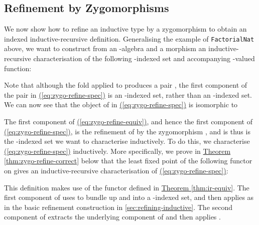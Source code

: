 \documentclass{LMCS}
\newcommand{\parenref}[1]{\hyperref[#1]{(\ref*{#1})}}
\newcommand{\thmref}[1]{\hyperref[#1]{Theorem \ref*{#1}}}
\begin{document}
\subsection{Refinement by Zygomorphisms}\label{sec:zygo-refine-correct}

We now show how to refine an inductive type by a zygomorphism to
obtain an indexed inductive-recursive definition. Generalising the
example of \texttt{FactorialNat} above, we want to construct from an
-algebra  and a morphism  an inductive-recursive characterisation of the following
-indexed set and accompanying -valued function:

Note that although the fold 
applied to  produces a pair , the first component of the
pair in \parenref{eq:zygo-refine-spec} is an -indexed set, rather
than an -indexed set. We can now see that the object of
 in \parenref{eq:zygo-refine-spec} is
isomorphic to 

The first component of \parenref{eq:zygo-refine-equiv}, and hence the
first component of \parenref{eq:zygo-refine-spec}, is the refinement
of  by the zygomorphism , and is thus is the -indexed set
we want to characterise inductively. To do this, we
characterise \parenref{eq:zygo-refine-spec} inductively. More
specifically, we prove in \thmref{thm:zygo-refine-correct} below that
the least fixed point of the following functor on  gives an inductive-recursive characterisation of
\parenref{eq:zygo-refine-spec}:

\noindent
This definition makes use of the functor  defined in \thmref{thm:ir-equiv}. The
first component of  uses  to bundle up
 and  into a -indexed set, and then applies
 as in the basic refinement construction
in \autoref{sec:refining-inductive}. The second component of
 extracts the underlying  component of 
and then applies .
\end{document}
